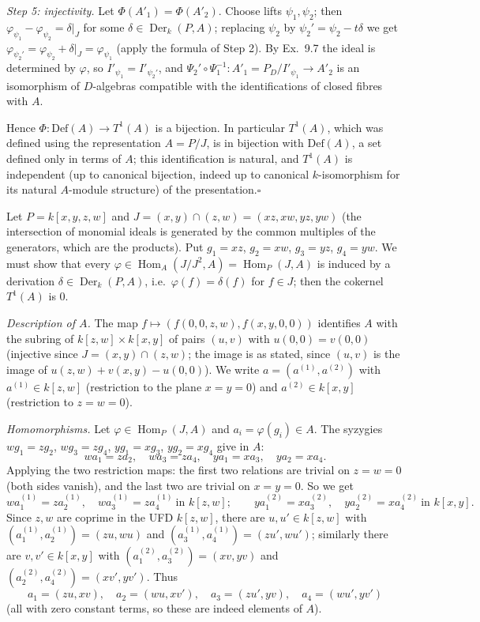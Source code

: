 \documentclass[11pt]{article}
\begin{document}
\emph{Step 5: injectivity.} Let $\Phi(A'_1)=\Phi(A'_2)$. Choose lifts $\psi_1,\psi_2$; then $\varphi_{\psi_1}-\varphi_{\psi_2}=\delta|_J$ for some $\delta\in\operatorname{Der}_k(P,A)$; replacing $\psi_2$ by $\psi_2'=\psi_2-t\delta$ we get $\varphi_{\psi_2'}=\varphi_{\psi_2}+\delta|_J=\varphi_{\psi_1}$ (apply the formula of Step 2). By Ex.~9.7 the ideal is determined by $\varphi$, so $I'_{\psi_1}=I'_{\psi_2'}$, and $\Psi_2'\circ\Psi_1^{-1}:A'_1=P_D/I'_{\psi_1}\to A'_2$ is an isomorphism of $D$-algebras compatible with the identifications of closed fibres with $A$.

Hence $\Phi:\mathrm{Def}(A)\to T^1(A)$ is a bijection. In particular $T^1(A)$, which was defined using the representation $A=P/J$, is in bijection with $\mathrm{Def}(A)$, a set defined only in terms of $A$; this identification is natural, and $T^1(A)$ is independent (up to canonical bijection, indeed up to canonical $k$-isomorphism for its natural $A$-module structure) of the presentation.\hfill$\square$

\pf
Let $P=k[x,y,z,w]$ and $J=(x,y)\cap(z,w)=(xz,xw,yz,yw)$ (the intersection of monomial ideals is generated by the common multiples of the generators, which are the products). Put $g_1=xz$, $g_2=xw$, $g_3=yz$, $g_4=yw$. We must show that every $\varphi\in\operatorname{Hom}_A(J/J^2,A)=\operatorname{Hom}_P(J,A)$ is induced by a derivation $\delta\in\operatorname{Der}_k(P,A)$, i.e.\ $\varphi(f)=\delta(f)$ for $f\in J$; then the cokernel $T^1(A)$ is $0$.

\emph{Description of $A$.} The map $f\mapsto(f(0,0,z,w),f(x,y,0,0))$ identifies $A$ with the subring of $k[z,w]\times k[x,y]$ of pairs $(u,v)$ with $u(0,0)=v(0,0)$ (injective since $J=(x,y)\cap(z,w)$; the image is as stated, since $(u,v)$ is the image of $u(z,w)+v(x,y)-u(0,0)$). We write $a=(a^{(1)},a^{(2)})$ with $a^{(1)}\in k[z,w]$ (restriction to the plane $x=y=0$) and $a^{(2)}\in k[x,y]$ (restriction to $z=w=0$).

\emph{Homomorphisms.} Let $\varphi\in\operatorname{Hom}_P(J,A)$ and $a_i=\varphi(g_i)\in A$. The syzygies $wg_1=zg_2$, $wg_3=zg_4$, $yg_1=xg_3$, $yg_2=xg_4$ give in $A$:
\[
wa_1=za_2,\quad wa_3=za_4,\quad ya_1=xa_3,\quad ya_2=xa_4 .
\]
Applying the two restriction maps: the first two relations are trivial on $z=w=0$ (both sides vanish), and the last two are trivial on $x=y=0$. So we get
\[
wa_1^{(1)}=za_2^{(1)},\quad wa_3^{(1)}=za_4^{(1)}\ \text{in }k[z,w];\qquad ya_1^{(2)}=xa_3^{(2)},\quad ya_2^{(2)}=xa_4^{(2)}\ \text{in }k[x,y].
\]
Since $z,w$ are coprime in the UFD $k[z,w]$, there are $u,u'\in k[z,w]$ with $(a_1^{(1)},a_2^{(1)})=(zu,wu)$ and $(a_3^{(1)},a_4^{(1)})=(zu',wu')$; similarly there are $v,v'\in k[x,y]$ with $(a_1^{(2)},a_3^{(2)})=(xv,yv)$ and $(a_2^{(2)},a_4^{(2)})=(xv',yv')$. Thus
\[
a_1=(zu,xv),\quad a_2=(wu,xv'),\quad a_3=(zu',yv),\quad a_4=(wu',yv')
\]
(all with zero constant terms, so these are indeed elements of $A$).
\end{document}
